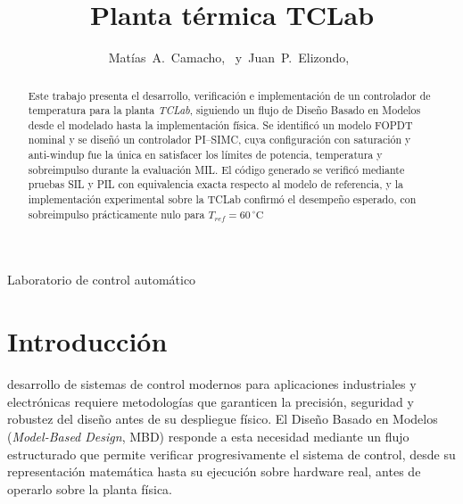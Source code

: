 \documentclass[journal]{IEEEtran}
\begin{document}
\setlength{\parindent}{4.2mm}
\title{Planta térmica TCLab}

\author{Matías~A.~Camacho,~
        y~Juan~P.~Elizondo,~
}

%
{Laboratorio de control automático}


\maketitle

\begin{abstract}
Este trabajo presenta el desarrollo, verificación e implementación de un controlador de temperatura
para la planta \textit{TCLab}, siguiendo un flujo de Diseño Basado en Modelos desde el modelado hasta la
implementación física. Se identificó un modelo FOPDT nominal y se diseñó un controlador PI--SIMC,
cuya configuración con saturación y anti-windup fue la única en satisfacer los límites de potencia,
temperatura y sobreimpulso durante la evaluación MIL. El código generado se verificó mediante pruebas
SIL y PIL con equivalencia exacta respecto al modelo de referencia, y la implementación experimental
sobre la TCLab confirmó el desempeño esperado, con sobreimpulso prácticamente nulo para
{\boldmath$T_{ref}=60\,^\circ\text{C}$}
\end{abstract}


\section{Introducción}

 desarrollo de sistemas de control modernos para aplicaciones industriales y electrónicas
requiere metodologías que garanticen la precisión, seguridad y robustez del diseño antes de su despliegue
físico. El Diseño Basado en Modelos (\textit{Model-Based Design}, MBD) responde a esta necesidad mediante
un flujo estructurado que permite verificar progresivamente el sistema de control, desde su representación
matemática hasta su ejecución sobre hardware real, antes de operarlo sobre la planta física.
\end{document}

